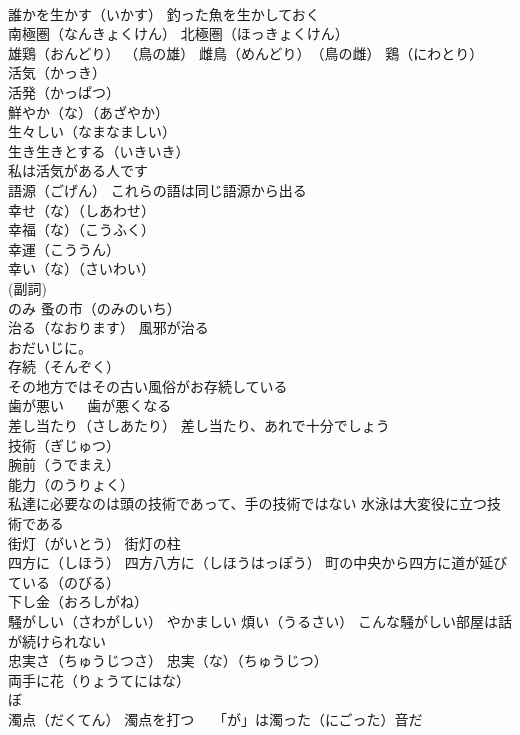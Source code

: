 \documentclass[8pt]{extreport}
\begin{document}
\begin{CJK}{UTF8}{min}
\\	誰かを生かす（いかす） 釣った魚を生かしておく
\\	南極圏（なんきょくけん） 北極圏（ほっきょくけん）
\\	雄鶏（おんどり） （鳥の雄） 雌鳥（めんどり）　（鳥の雌） 鶏（にわとり）
\\	活気（かっき）
\\	活発（かっぱつ）
\\	鮮やか（な）（あざやか）
\\	生々しい（なまなましい）
\\	生き生きとする（いきいき）
\\	私は活気がある人です
\\	語源（ごげん） これらの語は同じ語源から出る
\\	幸せ（な）（しあわせ）
\\	幸福（な）（こうふく）
\\	幸運（こううん）
\\	幸い（な）（さいわい）
\\	(副詞)
\\	のみ 蚤の市（のみのいち）
\\	治る（なおります） 風邪が治る
\\	おだいじに。
\\	存続（そんぞく）
\\	その地方ではその古い風俗がお存続している
\\	歯が悪い 　 歯が悪くなる
\\	差し当たり（さしあたり） 差し当たり、あれで十分でしょう
\\	技術（ぎじゅつ） 
\\	腕前（うでまえ）
\\	能力（のうりょく） 
\\	私達に必要なのは頭の技術であって、手の技術ではない 水泳は大変役に立つ技術である
\\	街灯（がいとう） 街灯の柱
\\	四方に（しほう） 四方八方に（しほうはっぽう） 町の中央から四方に道が延びている（のびる）
\\	下し金（おろしがね）
\\	騒がしい（さわがしい） やかましい 煩い（うるさい） こんな騒がしい部屋は話が続けられない
\\	忠実さ（ちゅうじつさ） 忠実（な）（ちゅうじつ）
\\	両手に花（りょうてにはな）
\\	ぼ 
\\	濁点（だくてん） 濁点を打つ　 「が」は濁った（にごった）音だ

\end{CJK}
\end{document}
